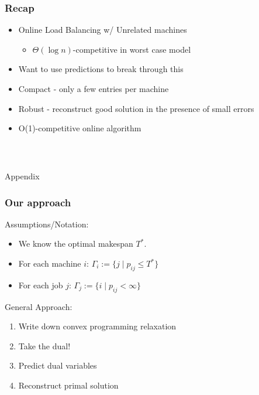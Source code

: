 \documentclass{beamer}
\begin{document}
\begin{frame}
\frametitle{Recap}

\begin{itemize}[<+->]
\item Online Load Balancing w/ Unrelated machines
\begin{itemize}
\item $\Theta(\log n)$-competitive in worst case model
\end{itemize}
\item Want to use predictions to break through this
\item Compact - only a few entries per machine
\item Robust - reconstruct good solution in the presence of small errors
\item O(1)-competitive online algorithm
\end{itemize}


\end{frame}



\begin{frame}
\frametitle{ \ }

\centering
\huge
Appendix

\end{frame}


\begin{frame}
\frametitle{Our approach}

Assumptions/Notation:
\begin{itemize}
\item We know the optimal makespan $T^*$.
\item For each machine $i$: $\Gamma_i := \{ j \mid p_{ij} \leq T^*\}$
\item For each job $j$: $\Gamma_j :=\{ i \mid p_{ij} < \infty\}$

\end{itemize}

\vspace{0.5cm}

General Approach:

\begin{enumerate}
\item Write down convex programming relaxation
\item Take the dual!
\item Predict dual variables
\item Reconstruct primal solution
\end{enumerate}

\end{frame}
\end{document}
